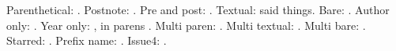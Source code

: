 \documentclass{article}
\begin{document}
Parenthetical: \parencite{smith2020}.
Postnote: \parencite[p.~5]{smith2020}.
Pre and post: \parencite[cf.][p.~7]{jones2019}.
Textual: \textcite{jones2019} said things.
Bare: \cite{trio2021}.
Author only: \citeauthor{smith2020}.
Year only: \citeyear{smith2020}, in parens \citeyearpar{smith2020}.
Multi paren: \parencites[see][]{smith2020}[p.~3]{jones2019}.
Multi textual: \textcites{smith2020}{trio2021}.
Multi bare: \cites{smith2020}{jones2019}.
Starred: \parencite*{trio2021}.
Prefix name: \textcite{vandenberg2018}.
Issue4: \parencite[see][]{smith2020}.
\printbibliography
\end{document}
